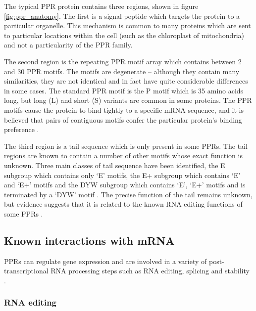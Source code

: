 The typical PPR protein contains three regions, shown in figure
\ref{fig:ppr_anatomy}.
The first is a signal peptide which targets the protein to a particular 
organelle.
This mechanism is common to many proteins which are sent to particular
locations within the cell (such as the chloroplast of mitochondria) and not a
particularity of the PPR family. 

The second region is the repeating PPR motif array which contains between 2 and
30 PPR motifs.
The motifs are degenerate -- although they contain many similarities, they are
not identical and in fact have quite considerable differences in some cases.
The standard PPR motif is the P motif which is 35 amino acids long, 
but long (L) and short (S) variants are common in some proteins.
The PPR motifs cause the protein to bind tightly to a specific mRNA sequence,
and it is believed that pairs of contiguous motifs confer the particular
protein's binding preference \citep{Kobayashi2012}.

The third region is a tail sequence which is only present in some PPRs.
The tail regions are known to contain a number of other motifs whose exact
function is unknown.
Three main classes of tail sequence have been identified, 
the E subgroup which contains
only `E' motifs, the E+ subgroup which contains `E' and `E+' motifs and the DYW
subgroup which contains `E', `E+' motifs and is terminated by a `DYW' motif
\citep{Lurin2004}.
The precise function of the tail remains unknown, but evidence suggests that it
is related to the known RNA editing functions of some PPRs \citep{Yagi2013a}.

\subsection{Known interactions with mRNA}

PPRs can regulate gene expression and are involved in a variety of
post-transcriptional RNA processing steps such as RNA editing, splicing and
stability \citep{Schmitz-Linneweber2008,Nakamura2012}.

\subsubsection{RNA editing}

